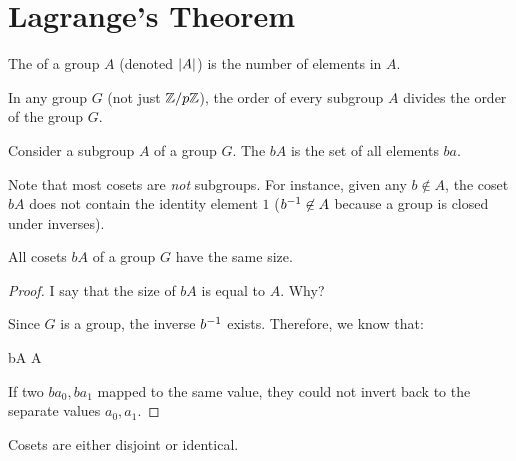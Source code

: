 \section{Lagrange's Theorem}

\begin{definition}
  The  of a group $A$ (denoted $|A|$) is the number
  of elements in $A$.
\end{definition}

\begin{theorem}

  In any group $G$ (not just $\mathbb{Z} / p\mathbb{Z}$), the order of every subgroup $A$
  divides the order of the group $G$.
\end{theorem}

\begin{definition}
  Consider a subgroup $A$ of a group $G$. The  $bA$ is
  the set of all elements $ba$.

  Note that most cosets are \emph{not} subgroups. For instance, given
  any $b \not\in A$, the coset $bA$ does not contain the identity
  element $1$ (${b}^{-1} \not\in A$ because a group is closed under
  inverses).
\end{definition}

\begin{lemma}
  All cosets $bA$ of a group $G$ have the same size.
\end{lemma}

\begin{proof}
  I say that the size of $bA$ is equal to $A$. Why?

  Since $G$ is a group, the inverse ${b}^{-1}$ exists. Therefore, we know
  that:

  \begin{nedqn}
     bA
  \eqcol
    A
  \end{nedqn}

  If two $b a_0, b a_1$ mapped to the same value, they could not invert
  back to the separate values $a_0, a_1$.
\end{proof}

\begin{lemma}
  Cosets are either disjoint or identical.
\end{lemma}

